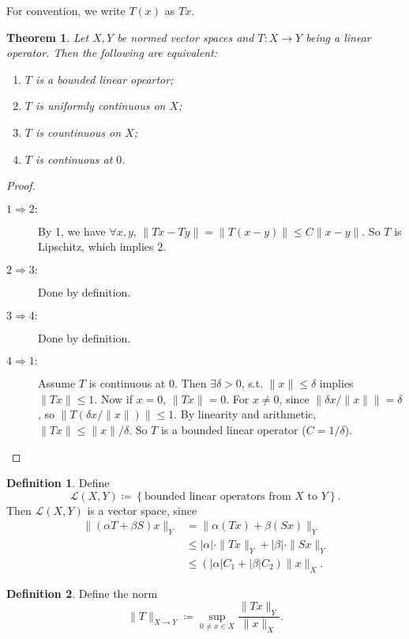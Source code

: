 \documentclass[12pt]{article}
\theoremstyle{plain}
\newtheorem{thm}{Theorem}
\theoremstyle{definition}
\newtheorem*{defn}{Definition}
\begin{document}
For convention, we write $T(x)$ as $Tx$.
\begin{thm}
    Let $X, Y$ be normed vector spaces and $T: X\rightarrow Y$ being a linear operator.
    Then the following are equivalent:
    \begin{enumerate}
        \item $T$ is a bounded linear opeartor;
        \item $T$ is uniformly continuous on $X$;
        \item $T$ is countinuous on $X$;
        \item $T$ is continuous at $0$.
    \end{enumerate}
\end{thm}
\begin{proof}
    \begin{description}
        \item[$1\Rightarrow 2:$] By 1, we have $\forall x,y$, $\|Tx - Ty\| = \|T(x-y)\| \leq C\|x-y\|$.
            So $T$ is Lipschitz, which implies $2$.
        \item[$2\Rightarrow 3:$] Done by definition.
        \item[$3\Rightarrow 4:$] Done by definition.
        \item[$4\Rightarrow 1:$] Assume $T$ is continuous at $0$.
            Then $\exists \delta > 0$, s.t. $\|x\|\leq \delta$ implies $\|Tx\| \leq 1$.
            Now if $x=0$, $\|Tx\| = 0$.
            For $x\neq 0$, since $\left\|\delta x/\|x\|\right\| = \delta$, so $\left\|T(\delta x/\|x\|)\right\|\leq 1$.
            By linearity and arithmetic, 
            $\|Tx\|\leq \|x\|/\delta$.
            So $T$ is a bounded linear operator ($C=1/\delta$).
    \end{description}
\end{proof}

\begin{defn}
    Define
    \[
        \mathcal{L}(X,Y)\coloneqq \left\{\text{bounded linear operators from }X\text{ to }Y\right\}.
    \]
    Then $\mathcal{L}(X,Y)$ is a vector space, since
    \[\begin{aligned}
            \|(\alpha T+\beta S) x\|_Y & = \|\alpha(Tx) + \beta(Sx)\|_Y\\
                                       &\leq |\alpha|\cdot\|Tx\|_Y + |\beta|\cdot \|Sx\|_Y\\
                                       &\leq (|\alpha| C_1 + |\beta| C_2)\|x\|_X.
    \end{aligned}\]
\end{defn}
\begin{defn}
    Define the norm
    \[
        \|T\|_{X\rightarrow Y} \coloneqq \sup_{0\neq x\in
        X}\frac{\|Tx\|_Y}{\|x\|_X}.
    \]
\end{defn}
\end{document}
